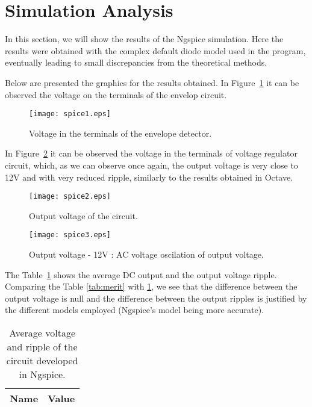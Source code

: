 \section{Simulation Analysis}
\label{sec:simulation}
In this section, we will show the results of the Ngspice simulation. Here the results were obtained with the complex default diode model used in the program, eventually leading to small discrepancies from the theoretical methods.

Below are presented the graphics for the results obtained. In Figure~\ref{fig:sim1} it can be observed the voltage on the terminals of the envelop circuit.

\begin{figure}[H] \centering
\texttt{[image: spice1.eps]}
\caption{Voltage in the terminals of the envelope detector.}
\label{fig:sim1}
\end{figure}

In Figure~\ref{fig:sim2} it can be observed the voltage in the terminals of voltage regulator circuit, which, as we can observe once again, the output voltage is very close to 12V and with very reduced ripple, similarly to the results obtained in Octave.

\begin{figure}[H] \centering
\texttt{[image: spice2.eps]}
\caption{Output voltage of the circuit.}
\label{fig:sim2}
\end{figure}

\begin{figure}[H] \centering
\texttt{[image: spice3.eps]}
\caption{Output voltage - 12V : AC voltage oscilation of output voltage.}
\label{fig:sim3}
\end{figure}

The Table~\ref{tab:merit_spice} shows the average DC output and the output voltage ripple. Comparing the Table \ref{tab:merit} with \ref{tab:merit_spice}, we see that the difference between the output voltage is null and the difference between the output ripples is justified by the different models employed (Ngspice's model being more accurate).

\begin{table}[H]
  \centering
  \begin{tabular}{|l|r|}
    \hline    
    {\bf Name} & {\bf Value} \\ \hline
	
  \end{tabular}
  \caption{Average voltage and ripple of the circuit developed in Ngspice.}
  \label{tab:merit_spice}
\end{table}
